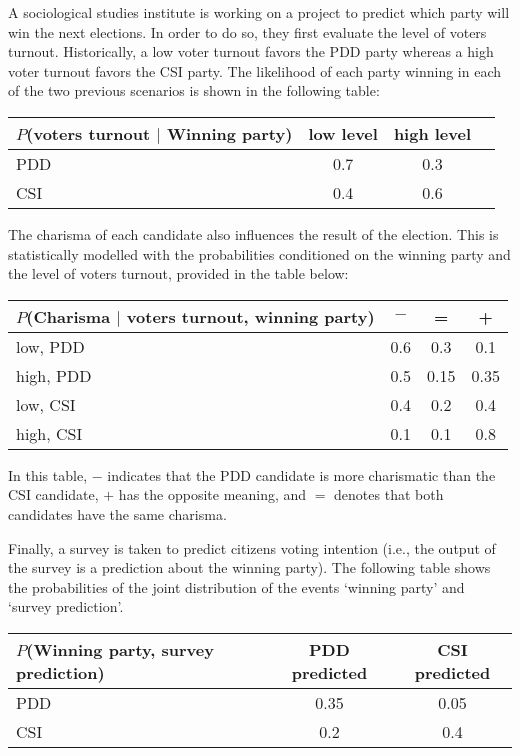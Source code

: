 \else

\question A sociological studies institute is working on a project to predict which party will win the next elections. In order to do so, they first evaluate the level of voters turnout. Historically, a low voter turnout favors the PDD party whereas a high voter turnout favors the CSI party. The likelihood of each party winning in each of the two previous scenarios is shown in the following table:
\begin{center} 
\begin{tabular}{l|ccc}
$P$(voters turnout $|$ Winning party) & low level & high level \\ 
\hline
PDD       & 0.7 & 0.3 \\ 
CSI & 0.4 &  0.6 \\
\end{tabular}
\end{center}

The charisma of each candidate also influences the result of the election. This is statistically modelled with the probabilities conditioned on the winning party and the level of voters turnout, provided in the table below:
\begin{center} 
\begin{tabular}{l|ccc}
$P$(Charisma $|$ voters turnout, winning party) & $-$ & =& + \\ 
\hline
low, PDD       & 0.6 & 0.3 & 0.1\\ 
high, PDD       & 0.5 & 0.15 & 0.35\\ 
low, CSI      & 0.4 & 0.2 & 0.4\\ 
high, CSI       & 0.1 & 0.1 & 0.8\\
\end{tabular}
\end{center}

In this table, $-$ indicates that the PDD candidate is more charismatic than the CSI candidate, $+$ has the opposite meaning, and $=$ denotes that both candidates have the same charisma.

Finally, a survey is taken to predict citizens voting intention (i.e., the output of the survey is a prediction about the winning party). The following table shows the probabilities of the joint distribution of the events `winning party' and `survey prediction'.
\begin{center} 
\begin{tabular}{l|cc}
$P$(Winning party, survey prediction) & PDD predicted &  CSI predicted \\ 
\hline
PDD       & 0.35 & 0.05 \\ 
CSI & 0.2 & 0.4 \\
\end{tabular}
\end{center}

